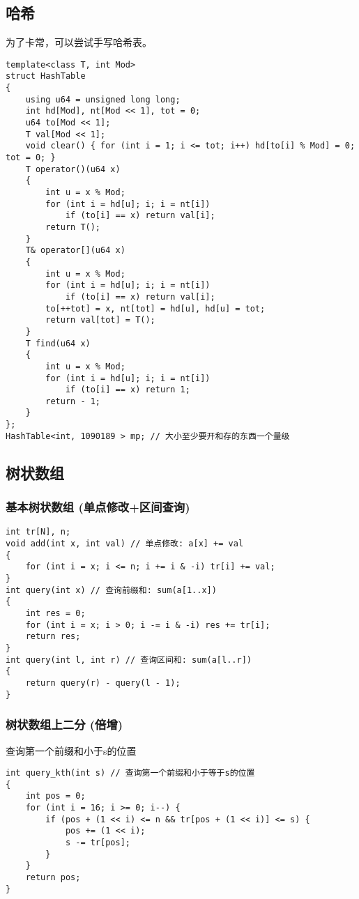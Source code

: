 \documentclass[a4paper, fontset=none]{ctexart}
\begin{document}
\subsection{哈希}
为了卡常，可以尝试手写哈希表。
\begin{verbatim}
template<class T, int Mod>
struct HashTable
{
    using u64 = unsigned long long;
    int hd[Mod], nt[Mod << 1], tot = 0;
    u64 to[Mod << 1];
    T val[Mod << 1];
    void clear() { for (int i = 1; i <= tot; i++) hd[to[i] % Mod] = 0; tot = 0; }
    T operator()(u64 x)
    {
        int u = x % Mod;
        for (int i = hd[u]; i; i = nt[i])
            if (to[i] == x) return val[i];
        return T();
    }
    T& operator[](u64 x)
    {
        int u = x % Mod;
        for (int i = hd[u]; i; i = nt[i])
            if (to[i] == x) return val[i];
        to[++tot] = x, nt[tot] = hd[u], hd[u] = tot;
        return val[tot] = T();
    }
    T find(u64 x)
    {
        int u = x % Mod;
        for (int i = hd[u]; i; i = nt[i])
            if (to[i] == x) return 1;
        return - 1;
    }
};
HashTable<int, 1090189 > mp; // 大小至少要开和存的东西一个量级
\end{verbatim}
\subsection{树状数组}
\subsubsection{基本树状数组 (单点修改+区间查询)}

\begin{verbatim}
int tr[N], n;
void add(int x, int val) // 单点修改: a[x] += val
{
    for (int i = x; i <= n; i += i & -i) tr[i] += val;
}
int query(int x) // 查询前缀和: sum(a[1..x])
{
    int res = 0;
    for (int i = x; i > 0; i -= i & -i) res += tr[i];
    return res;
}
int query(int l, int r) // 查询区间和: sum(a[l..r])
{
    return query(r) - query(l - 1);
}
\end{verbatim}

\subsubsection{树状数组上二分 (倍增)}

查询第一个前缀和小于s的位置

\begin{verbatim}
int query_kth(int s) // 查询第一个前缀和小于等于s的位置
{
    int pos = 0;
    for (int i = 16; i >= 0; i--) {
        if (pos + (1 << i) <= n && tr[pos + (1 << i)] <= s) {
            pos += (1 << i);
            s -= tr[pos];
        }
    }
    return pos;
}
\end{verbatim}
\end{document}

